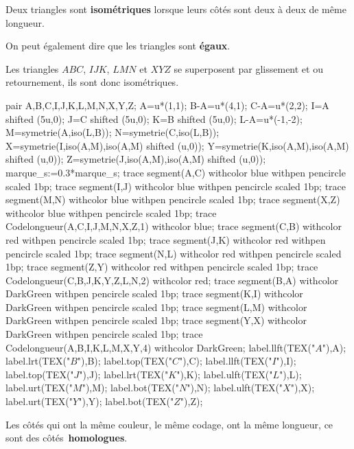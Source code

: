 
\begin{definition}
    Deux triangles sont \textbf{isométriques} lorsque leurs côtés sont deux à deux de même longueur.
\end{definition}

\begin{remarque}
    On peut également dire que les triangles sont \textbf{égaux}.
\end{remarque}

\begin{exemple*1}
    Les triangles $ABC$, $IJK$, $LMN$ et $XYZ$ se superposent par glissement et ou retournement, ils sont donc isométriques.
    \begin{center}
        \begin{Geometrie}[Cadre="aucun"]
            pair A,B,C,I,J,K,L,M,N,X,Y,Z;
            A=u*(1,1);
            B-A=u*(4,1);
            C-A=u*(2,2);
            I=A shifted (5u,0);
            J=C shifted (5u,0);
            K=B shifted (5u,0);
            L-A=u*(-1,-2);
            M=symetrie(A,iso(L,B));
            N=symetrie(C,iso(L,B));
            X=symetrie(I,iso(A,M),iso(A,M) shifted (u,0));
            Y=symetrie(K,iso(A,M),iso(A,M) shifted (u,0));
            Z=symetrie(J,iso(A,M),iso(A,M) shifted (u,0));
            marque_s:=0.3*marque_s;
            trace segment(A,C) withcolor blue withpen pencircle scaled 1bp;
            trace segment(I,J) withcolor blue withpen pencircle scaled 1bp;
            trace segment(M,N) withcolor blue withpen pencircle scaled 1bp;
            trace segment(X,Z) withcolor blue withpen pencircle scaled 1bp;
            trace Codelongueur(A,C,I,J,M,N,X,Z,1) withcolor blue;
            trace segment(C,B) withcolor red withpen pencircle scaled 1bp;
            trace segment(J,K) withcolor red withpen pencircle scaled 1bp;
            trace segment(N,L) withcolor red withpen pencircle scaled 1bp;
            trace segment(Z,Y) withcolor red withpen pencircle scaled 1bp;
            trace Codelongueur(C,B,J,K,Y,Z,L,N,2) withcolor red;
            trace segment(B,A) withcolor DarkGreen withpen pencircle scaled 1bp;
            trace segment(K,I) withcolor DarkGreen withpen pencircle scaled 1bp;
            trace segment(L,M) withcolor DarkGreen withpen pencircle scaled 1bp;
            trace segment(Y,X) withcolor DarkGreen withpen pencircle scaled 1bp;
            trace Codelongueur(A,B,I,K,L,M,X,Y,4) withcolor DarkGreen;
            label.llft(TEX("$A$"),A);
            label.lrt(TEX("$B$"),B);
            label.top(TEX("$C$"),C);
            label.llft(TEX("$I$"),I);
            label.top(TEX("$J$"),J);
            label.lrt(TEX("$K$"),K);
            label.ulft(TEX("$L$"),L);
            label.urt(TEX("$M$"),M);
            label.bot(TEX("$N$"),N);
            label.ulft(TEX("$X$"),X);
            label.urt(TEX("$Y$"),Y);
            label.bot(TEX("$Z$"),Z);
        \end{Geometrie}        
    \end{center}
    \smallskip
        Les côtés qui ont la même couleur, le même codage, ont la même longueur, ce sont des \mbox{côtés \textbf{homologues}.}
\end{exemple*1}

